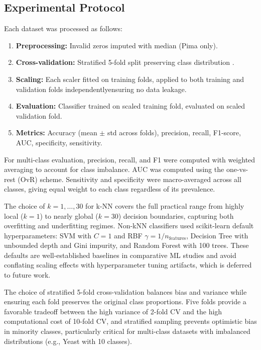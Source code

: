 \documentclass[12pt,a4paper]{article}
\begin{document}
\subsection{Experimental Protocol}
\label{sec:protocol}

Each dataset was processed as follows:
\begin{enumerate}
  \item \textbf{Preprocessing:} Invalid zeros imputed with median (Pima only).
  \item \textbf{Cross-validation:} Stratified 5-fold split preserving class distribution \cite{bates2023crossval}.
  \item \textbf{Scaling:} Each scaler fitted on training folds, applied to both training and validation folds independently\textemdash ensuring no data leakage.
  \item \textbf{Evaluation:} Classifier trained on scaled training fold, evaluated on scaled validation fold.
  \item \textbf{Metrics:} Accuracy (mean $\pm$ std across folds), precision, recall, F1-score, AUC, specificity, sensitivity.
\end{enumerate}

For multi-class evaluation, precision, recall, and F1 were computed with weighted averaging to account for class imbalance. AUC was computed using the one-vs-rest (OvR) scheme. Sensitivity and specificity were macro-averaged across all classes, giving equal weight to each class regardless of its prevalence.

The choice of $k=1,\dots,30$ for k-NN covers the full practical range from highly local ($k=1$) to nearly global ($k=30$) decision boundaries, capturing both overfitting and underfitting regimes. Non-kNN classifiers used scikit-learn default hyperparameters: SVM with $C=1$ and RBF $\gamma=1/n_{\text{features}}$, Decision Tree with unbounded depth and Gini impurity, and Random Forest with 100 trees. These defaults are well-established baselines in comparative ML studies and avoid conflating scaling effects with hyperparameter tuning artifacts, which is deferred to future work.

The choice of stratified 5-fold cross-validation balances bias and variance while ensuring each fold preserves the original class proportions. Five folds provide a favorable tradeoff between the high variance of 2-fold CV and the high computational cost of 10-fold CV, and stratified sampling prevents optimistic bias in minority classes, particularly critical for multi-class datasets with imbalanced distributions (e.g., Yeast with 10 classes).
\end{document}
